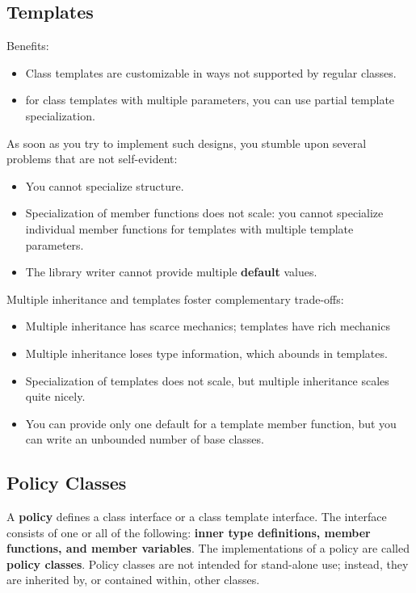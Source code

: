 \subsection{Templates}

Benefits:
\begin{itemize}
\item Class templates are customizable in ways not supported by
  regular classes.
\item for class templates with multiple parameters, you can use
  partial template specialization.
\end{itemize}

As soon as you try to implement such designs, you stumble upon several
problems that are not self-evident:
\begin{itemize}
\item You cannot specialize structure.
\item Specialization of member functions does not scale: you cannot
  specialize individual member functions for templates with multiple
  template parameters.
\item The library writer cannot provide multiple \textbf{default} values.
\end{itemize}

Multiple inheritance and templates foster complementary trade-offs:
\begin{itemize}
\item Multiple inheritance has scarce mechanics; templates have rich
mechanics
\item Multiple inheritance loses type information, which abounds
in templates.
\item Specialization of templates does not scale, but multiple
inheritance scales quite nicely.
\item You can provide only one default for
a template member function, but you can write an unbounded 
number of base classes.
\end{itemize}

\subsection{Policy Classes}

A \textbf{policy} defines a class interface or a class template interface. The
interface consists of one or all of the following: \textbf{inner type
definitions, member functions, and member variables}. The
implementations of a policy are called \textbf{policy classes}. Policy classes
are not intended for stand-alone use; instead, they are inherited by,
or contained within, other classes.

